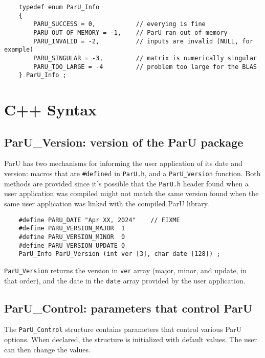 \documentclass[12pt]{article}
\begin{document}
    {\footnotesize
    \begin{verbatim}
    typedef enum ParU_Info
    {
        PARU_SUCCESS = 0,           // everying is fine
        PARU_OUT_OF_MEMORY = -1,    // ParU ran out of memory
        PARU_INVALID = -2,          // inputs are invalid (NULL, for example)
        PARU_SINGULAR = -3,         // matrix is numerically singular
        PARU_TOO_LARGE = -4         // problem too large for the BLAS
    } ParU_Info ; \end{verbatim}}

\section{C++ Syntax}

\subsection{{\sf ParU\_Version}: version of the ParU package}

    ParU has two mechanisms for informing the user application of its date and
    version: macros that are \verb'#define'd in \verb'ParU.h', and a
    \verb'ParU_Version' function.  Both methods are provided since it's
    possible that the \verb'ParU.h' header found when a user application was
    compiled might not match the same version found when the same user
    application was linked with the compiled ParU library.

    {\footnotesize
    \begin{verbatim}
    #define PARU_DATE "Apr XX, 2024"    // FIXME
    #define PARU_VERSION_MAJOR  1
    #define PARU_VERSION_MINOR  0
    #define PARU_VERSION_UPDATE 0
    ParU_Info ParU_Version (int ver [3], char date [128]) ; \end{verbatim}}

    \verb'ParU_Version' returns the version in \verb'ver' array (major, minor,
    and update, in that order), and the date in the \verb'date' array provided
    by the user application.

\subsection{{\sf ParU\_Control}: parameters that control ParU}

    The \verb'ParU_Control' structure contains parameters that control various
    ParU options.  When declared, the structure is initialized with default
    values.  The user can then change the values.
\end{document}
